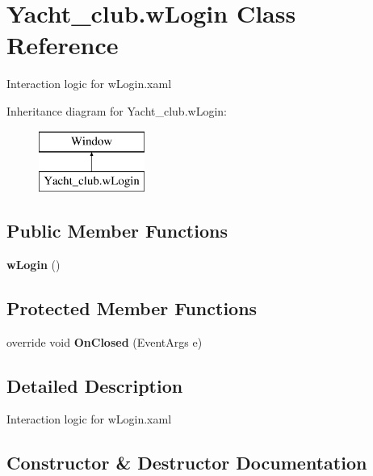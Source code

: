 \section{Yacht\+\_\+club.\+w\+Login Class Reference}
\label{class_yacht__club_1_1w_login}


Interaction logic for w\+Login.\+xaml  


Inheritance diagram for Yacht\+\_\+club.\+w\+Login\+:\begin{figure}[H]
\begin{center}
\leavevmode
\includegraphics[height=2.000000cm]{class_yacht__club_1_1w_login}
\end{center}
\end{figure}
\subsection*{Public Member Functions}
\begin{DoxyCompactItemize}
\item 
\textbf{ w\+Login} ()
\end{DoxyCompactItemize}
\subsection*{Protected Member Functions}
\begin{DoxyCompactItemize}
\item 
override void \textbf{ On\+Closed} (Event\+Args e)
\end{DoxyCompactItemize}


\subsection{Detailed Description}
Interaction logic for w\+Login.\+xaml 



\subsection{Constructor \& Destructor Documentation}
\mbox{\label{class_yacht__club_1_1w_login_ad570072cc543270f9c8c82c9e210de08}} 
